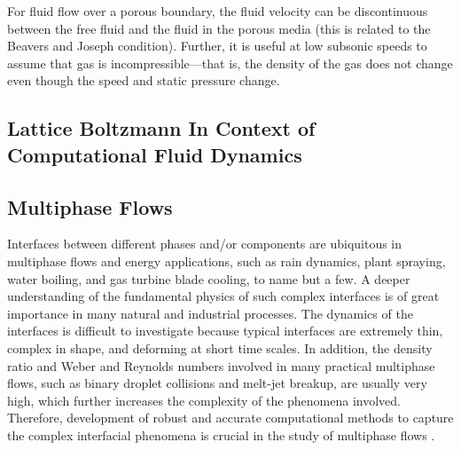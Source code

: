For fluid flow over a porous boundary, the fluid velocity can be discontinuous between the free fluid and the fluid in the porous media (this is related to the Beavers and Joseph condition). Further, it is useful at low subsonic speeds to assume that gas is incompressible—that is, the density of the gas does not change even though the speed and static pressure change.


\subsection{Lattice Boltzmann In Context of Computational Fluid Dynamics}




%
%
%
%
%
%
%

\subsection{Multiphase Flows}

Interfaces between different phases and/or components are ubiquitous in multiphase flows and energy applications, such as rain dynamics, plant spraying, water boiling, and gas turbine blade cooling, to name but a few. A deeper understanding of the fundamental physics of such complex interfaces is of great importance in many natural and industrial processes. The dynamics of the interfaces is difficult to investigate because typical interfaces are extremely thin, complex in shape, and deforming at short time scales. In addition, the density ratio and Weber and Reynolds numbers involved in many practical multiphase flows, such as binary droplet collisions and melt-jet breakup, are usually very high, which further increases the complexity of the phenomena involved. Therefore, development of robust and accurate computational methods to capture the complex interfacial phenomena is crucial in the study of multiphase flows \cite{feiModelingRealisticMultiphase2019}.

